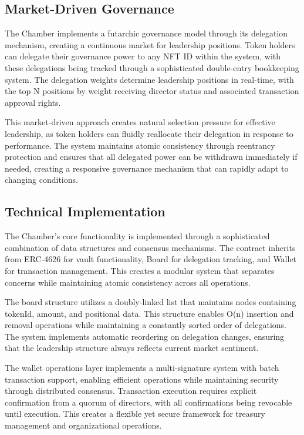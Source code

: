 \documentclass[12pt]{article}
\begin{document}
\subsection{Market-Driven Governance}
The Chamber implements a futarchic governance model through its delegation mechanism, creating a continuous market for leadership positions. Token holders can delegate their governance power to any NFT ID within the system, with these delegations being tracked through a sophisticated double-entry bookkeeping system. The delegation weights determine leadership positions in real-time, with the top N positions by weight receiving director status and associated transaction approval rights.

This market-driven approach creates natural selection pressure for effective leadership, as token holders can fluidly reallocate their delegation in response to performance. The system maintains atomic consistency through reentrancy protection and ensures that all delegated power can be withdrawn immediately if needed, creating a responsive governance mechanism that can rapidly adapt to changing conditions.

\subsection{Technical Implementation}
The Chamber's core functionality is implemented through a sophisticated combination of data structures and consensus mechanisms. The contract inherits from ERC-4626 for vault functionality, Board for delegation tracking, and Wallet for transaction management. This creates a modular system that separates concerns while maintaining atomic consistency across all operations.

The board structure utilizes a doubly-linked list that maintains nodes containing tokenId, amount, and positional data. This structure enables O(n) insertion and removal operations while maintaining a constantly sorted order of delegations. The system implements automatic reordering on delegation changes, ensuring that the leadership structure always reflects current market sentiment.

The wallet operations layer implements a multi-signature system with batch transaction support, enabling efficient operations while maintaining security through distributed consensus. Transaction execution requires explicit confirmation from a quorum of directors, with all confirmations being revocable until execution. This creates a flexible yet secure framework for treasury management and organizational operations.
\end{document}
